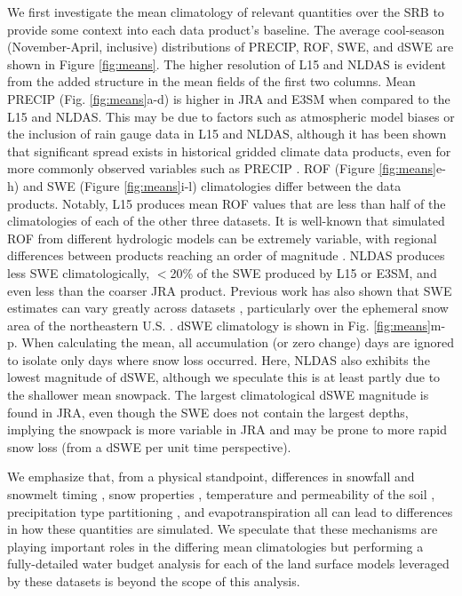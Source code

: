 \documentclass[nhess, manuscript]{copernicus}
\begin{document}
We first investigate the mean climatology of relevant quantities over the SRB to provide some context into each data product's baseline.
The average cool-season (November-April, inclusive) distributions of PRECIP, ROF, SWE, and dSWE are shown in Figure \ref{fig:means}.
The higher resolution of L15 and NLDAS is evident from the added structure in the mean fields of the first two columns.
Mean PRECIP (Fig. \ref{fig:means}a-d) is higher in JRA and E3SM when compared to the L15 and NLDAS.
This may be due to factors such as atmospheric model biases or the inclusion of rain gauge data in L15 and NLDAS, although it has been shown that significant spread exists in historical gridded climate data products, even for more commonly observed variables such as PRECIP \citep{gutmann2012comparison,livneh2014filling,henn2018an}.
ROF (Figure \ref{fig:means}e-h) and SWE (Figure \ref{fig:means}i-l) climatologies differ between the data products.
Notably, L15 produces mean ROF values that are less than half of the climatologies of each of the other three datasets.
It is well-known that simulated ROF from different hydrologic models can be extremely variable, with regional differences between products reaching an order of magnitude \citep{gudmundsson2012comparing,sood2015global,beck2017global}.
NLDAS produces less SWE climatologically, $<$20\% of the SWE produced by L15 or E3SM, and even less than the coarser JRA product.
Previous work has also shown that SWE estimates can vary greatly across datasets \citep{lundquist2015high,Rhoades2018a}, particularly over the ephemeral snow area of the northeastern U.S. \citep{mccrary2017evaluation,mccrary2022projections}.
dSWE climatology is shown in Fig. \ref{fig:means}m-p.
When calculating the mean, all accumulation (or zero change) days are ignored to isolate only days where snow loss occurred.
Here, NLDAS also exhibits the lowest magnitude of dSWE, although we speculate this is at least partly due to the shallower mean snowpack.
The largest climatological dSWE magnitude is found in JRA, even though the SWE does not contain the largest depths, implying the snowpack is more variable in JRA and may be prone to more rapid snow loss (from a dSWE per unit time perspective).

We emphasize that, from a physical standpoint, differences in snowfall and snowmelt timing \citep{rauscher2008future,mccabe2005trends}, snow properties \citep{brown2006evaluation}, temperature and permeability of the soil \citep{niu2006effects}, precipitation type partitioning \citep{knowles2006trends}, and evapotranspiration \citep{zheng2019on} all can lead to differences in how these quantities are simulated.
We speculate that these mechanisms are playing important roles in the differing mean climatologies but performing a fully-detailed water budget analysis for each of the land surface models leveraged by these datasets is beyond the scope of this analysis.
\end{document}
